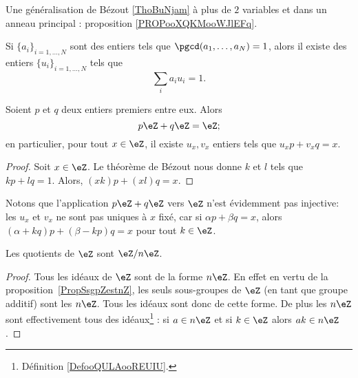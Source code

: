 Une généralisation de Bézout \ref{ThoBuNjam} à plus de \( 2\) variables et dans un anneau principal : proposition \ref{PROPooXQKMooWJlEFq}.
\begin{proposition}     \label{PROPooWSMTooMdfqse}
	Si \( \{ a_i \}_{i=1,\ldots, N}\) sont des entiers tels que \( \pgcd(a_1,\ldots, a_N)=1\), alors il existe des entiers \( \{ u_i \}_{i=1,\ldots, N}\) tels que
	\begin{equation}
		\sum_ia_iu_i=1.
	\end{equation}
\end{proposition}

\begin{corollary}       \label{CorgEMtLj}
	Soient \( p\) et \( q\) deux entiers premiers entre eux. Alors
	\begin{equation}
		p\eZ+q\eZ=\eZ;
	\end{equation}
	en particulier, pour tout \( x \in \eZ \), il existe \( u_x, v_x \) entiers tels que \(u_x p + v_x q = x \).
\end{corollary}

\begin{proof}
	Soit \( x\in \eZ\). Le théorème de Bézout nous donne \( k\) et \( l\) tels que \( kp+lq=1\). Alors, \( (xk)p+(xl)q=x\).
\end{proof}

Notons que l'application \( p\eZ+q\eZ\) vers \( \eZ\) n'est évidemment pas injective: les \( u_x\) et \( v_x\) ne sont pas uniques à \( x\) fixé, car si \( \alpha p+\beta q=x\), alors \( (\alpha+kq)p+(\beta-kp)q=x\) pour tout \( k\in \eZ\).


\begin{corollary}       \label{CORooLINXooBlUKPG}
	Les quotients de \( \eZ\) sont \( \eZ/n\eZ\).
\end{corollary}

\begin{proof}
	Tous les idéaux de \( \eZ\) sont de la forme \( n\eZ\). En effet en vertu de la proposition~\ref{PropSsgpZestnZ}, les seuls sous-groupes de \( \eZ\) (en tant que groupe additif) sont les \( n\eZ\). Tous les idéaux sont donc de cette forme. De plus les \( n\eZ\) sont effectivement tous des idéaux\footnote{Définition \ref{DefooQULAooREUIU}.} : si \( a\in n\eZ\) et si \( k\in \eZ\) alors \( ak\in n\eZ\).
\end{proof}


